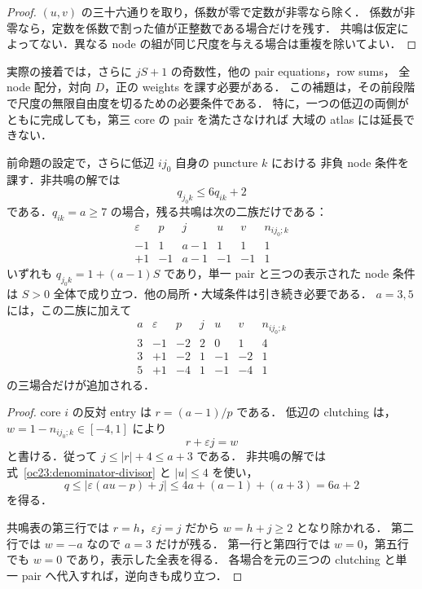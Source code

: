 \begin{proof}
$(u,v)$ の三十六通りを取り，係数が零で定数が非零なら除く．
係数が非零なら，定数を係数で割った値が正整数である場合だけを残す．
共鳴は仮定によってない．異なる node の組が同じ尺度を与える場合は重複を除いてよい．
\end{proof}

実際の接着では，さらに $jS+1$ の奇数性，他の pair equations，row sums，
全 node 配分，対向 $D$，正の weights を課す必要がある．
この補題は，その前段階で尺度の無限自由度を切るための必要条件である．
特に，一つの低辺の両側がともに完成しても，第三 core の pair を満たさなければ
大域の atlas には延長できない．

\begin{corollary}[低辺を横切る分母比較と残る共鳴]
\label{oc23:denominator-comparison}
前命題の設定で，さらに低辺 $ij_0$ 自身の puncture $k$ における
非負 node 条件を課す．非共鳴の解では
\[
 q_{j_0k}\le6q_{ik}+2
\]
である．$q_{ik}=a\ge7$ の場合，残る共鳴は次の二族だけである：
\[
\begin{array}{c|c|c|c|c|c}
 \varepsilon&p&j&u&v&n_{ij_0;k}\\\hline
 -1&1&a-1&1&1&1\\
 +1&-1&a-1&-1&-1&1
\end{array}
\]
いずれも $q_{j_0k}=1+(a-1)S$ であり，単一 pair と三つの表示された
node 条件は $S>0$ 全体で成り立つ．他の局所・大域条件は引き続き必要である．
$a=3,5$ には，この二族に加えて
\[
\begin{array}{c|c|c|c|c|c|c}
 a&\varepsilon&p&j&u&v&n_{ij_0;k}\\\hline
 3&-1&-2&2&0&1&4\\
 3&+1&-2&1&-1&-2&1\\
 5&+1&-4&1&-1&-4&1
\end{array}
\]
の三場合だけが追加される．
\end{corollary}

\begin{proof}
core $i$ の反対 entry は $r=(a-1)/p$ である．
低辺の clutching は，$w=1-n_{ij_0;k}\in[-4,1]$ により
\[
 r+\varepsilon j=w
\]
と書ける．従って $j\le|r|+4\le a+3$ である．
非共鳴の解では式~\eqref{oc23:denominator-divisor} と $|u|\le4$ を使い，
\[
 q\le|\varepsilon(au-p)+j|
 \le4a+(a-1)+(a+3)=6a+2
\]
を得る．

共鳴表の第三行では $r=h$，$\varepsilon j=j$ だから $w=h+j\ge2$ となり除かれる．
第二行では $w=-a$ なので $a=3$ だけが残る．
第一行と第四行では $w=0$，第五行でも $w=0$ であり，表示した全表を得る．
各場合を元の三つの clutching と単一 pair へ代入すれば，逆向きも成り立つ．
\end{proof}
